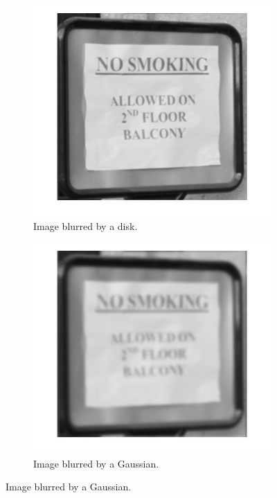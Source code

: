 \begin{figure}[h!]
\begin{subfigure}[b]{0.35\textwidth}
        \end{subfigure}
        \hspace{.6cm}
        \begin{subfigure}[b]{0.35\textwidth}
                 \centering
                 \includegraphics[width=\textwidth]{sign_D.jpg}
                 \caption{Image blurred by a disk.}
                       
        \end{subfigure}
        \hspace{.6cm}
        \begin{subfigure}[b]{0.35\textwidth}
                \centering
                \includegraphics[width=\textwidth]{sign_G.jpg}
                \caption{Image blurred by a Gaussian.} 
        \end{subfigure} 
       

\end{figure}
